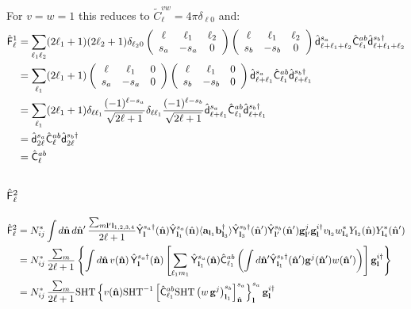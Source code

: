 \documentclass[a4paper,10pt]{article}
\newcommand{\nv}{\hat{\bf n}}
\newcommand{\wtj}[6]{\left(\begin{array}{ccc} #1 & #2 & #3\\#4 & #5 & #6\end{array} \right)}
\begin{document}
    For $v=w=1$ this reduces to $\tilde{C}^{vw}_\ell=4\pi\delta_{\ell0}$ and:
    \begin{align}\nonumber
      \hat{\sf F}^1_\ell
      &=\sum_{\ell_1\ell_2}(2\ell_1+1)(2\ell_2+1)\delta_{\ell_20}\wtj{\ell}{\ell_1}{\ell_2}{s_a}{-s_a}{0}\wtj{\ell}{\ell_1}{\ell_2}{s_b}{-s_b}{0}\hat{\sf d}^{s_a}_{\ell+\ell_1+\ell_2}\hat{\sf C}^{ab}_{\ell_1}\hat{\sf d}^{s_b\dag}_{\ell+\ell_1+\ell_2}\\\nonumber
      &=\sum_{\ell_1}(2\ell_1+1)\wtj{\ell}{\ell_1}{0}{s_a}{-s_a}{0}\wtj{\ell}{\ell_1}{0}{s_b}{-s_b}{0}\hat{\sf d}^{s_a}_{\ell+\ell_1}\hat{\sf C}^{ab}_{\ell_1}\hat{\sf d}^{s_b\dag}_{\ell+\ell_1}\\\nonumber
      &=\sum_{\ell_1}(2\ell_1+1)\delta_{\ell\ell_1}\frac{(-1)^{\ell-s_a}}{\sqrt{2\ell+1}}\delta_{\ell\ell_1}\frac{(-1)^{\ell-s_b}}{\sqrt{2\ell+1}}\hat{\sf d}^{s_a}_{\ell+\ell_1}\hat{\sf C}^{ab}_{\ell_1}\hat{\sf d}^{s_b\dag}_{\ell+\ell_1}\\\nonumber
      &=\hat{\sf d}^{s_a}_{2\ell}\hat{\sf C}^{ab}_{\ell}\hat{\sf d}^{s_b\dag}_{2\ell}\\\nonumber
      &=\hat{\sf C}^{ab}_{\ell}
    \end{align}


  \subsection{$\hat{\sf F}^2_\ell$}
    \begin{align}\nonumber
     \hat{\sf F}^2_\ell
     &=N^*_{ij}\int d\nv\,d\nv'\,\frac{\sum_{m{\bf l}'{\bf l}_{1,2,3,4}}}{2\ell+1}\hat{\sf Y}^{s_a\dag}_{\bf l}(\nv)\hat{\sf Y}^{s_a}_{{\bf l}_1}(\nv)\langle{\bf a}_{{\bf l}_1}{\bf b}^\dag_{{\bf l}_3}\rangle\hat{\sf Y}^{s_b\dag}_{{\bf l}_3}(\nv')\hat{\sf Y}^{s_b}_{{\bf l}'}(\nv'){\bf g}^j_{{\bf l}'}{\bf g}^{i\dag}_{\bf l}v_{{\bf l}_2}w^*_{{\bf l}_4}Y_{{\bf l}_2}(\nv)Y^*_{{\bf l}_4}(\nv')\\\nonumber
     &=N^*_{ij}\,\frac{\sum_m}{2\ell+1}\left\{\int d\nv\,v(\nv)\,\hat{\sf Y}^{s_a\dag}_{\bf l}(\nv)\left[\sum_{\ell_1m_1}\hat{\sf Y}^{s_a}_{{\bf l}_1}(\nv)\hat{\sf C}^{ab}_{\ell_1}\left(\int d\nv'\hat{\sf Y}^{s_b\dag}_{{\bf l}_1}(\nv'){\bf g}^j(\nv')w(\nv')\right)\right]{\bf g}^{i\dag}_{\bf l}\right\}\\\label{eq:bias_2}
     &=N^*_{ij}\,\frac{\sum_m}{2\ell+1}{\rm SHT}\left\{v(\nv){\rm SHT}^{-1}\left[\hat{\sf C}^{ab}_{\ell_1}{\rm SHT}\left(w\,{\bf g}^j\right)^{s_b}_{{\bf l}_1}\right]^{s_a}_{\nv}\right\}^{s_a}_{\bf l}{\bf g}^{i\dag}_{\bf l}
    \end{align}
    
\end{document}
